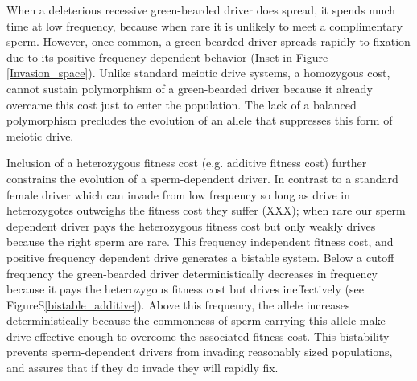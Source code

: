 \documentclass[12pt,letterpaper]{article}
\begin{document}
When a deleterious recessive green-bearded driver does spread, 
	it spends much time at low frequency, because when rare it is unlikely to meet a complimentary sperm. 
However, once common, a green-bearded driver spreads rapidly to fixation due to its
	positive frequency dependent behavior (Inset in Figure \ref{Invasion_space}).  
Unlike standard meiotic drive systems, a homozygous cost, cannot sustain polymorphism of a green-bearded driver 
	because it already overcame this cost just to enter the population.
The lack of a balanced polymorphism precludes the evolution of an allele that suppresses this form of meiotic drive.


Inclusion of a heterozygous fitness cost (e.g. additive fitness cost) further constrains the evolution of a sperm-dependent driver. In contrast to a  standard female  driver which can invade from low frequency so long as drive in heterozygotes outweighs the fitness cost they suffer (XXX); when rare our sperm dependent driver pays the heterozygous
        fitness cost but only weakly drives because the right sperm
        are rare. 
This frequency independent fitness cost, and positive frequency dependent drive generates a bistable system. 
Below a cutoff frequency the green-bearded driver deterministically decreases in frequency 
	because it pays the  heterozygous fitness cost  but drives ineffectively (see FigureS\ref{bistable_additive}). 
Above this frequency, the allele increases deterministically because the commonness of sperm carrying this allele 
	make drive effective enough to overcome the associated fitness cost.
This bistability prevents sperm-dependent drivers from invading 	
	reasonably sized populations, and assures that if they do invade they will rapidly fix.
\end{document}
